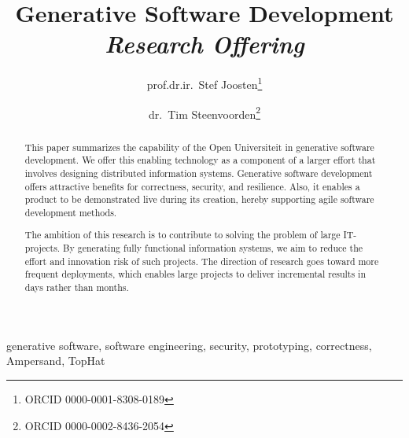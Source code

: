 \documentclass{elsarticle}
\begin{document}
% 

\title{Generative Software Development\\{\em\normalsize Research Offering}}
\author{prof.dr.ir.\ Stef Joosten\footnote{ORCID 0000-0001-8308-0189}}
\author{dr.\ Tim Steenvoorden\footnote{ORCID 0000-0002-8436-2054}}
\address{Open Universiteit Nederland, Heerlen, the Netherlands}

\begin{abstract}
    This paper summarizes the capability of the Open Universiteit in generative software development.
    We offer this enabling technology as a component of a larger effort that involves designing distributed information systems.
    Generative software development offers attractive benefits for correctness, security, and resilience.
    Also, it enables a product to be demonstrated live during its creation,
    hereby supporting agile software development methods.
   
    The ambition of this research is to contribute to solving the problem of large IT-projects.
    By generating fully functional information systems, we aim to reduce the effort and innovation risk of such projects.
    The direction of research goes toward more frequent deployments,
    which enables large projects to deliver incremental results in days rather than months.
\end{abstract}

\begin{keyword}
    generative software, software engineering, security, prototyping, correctness, Ampersand, TopHat
\end{keyword}
\maketitle
\end{document}
